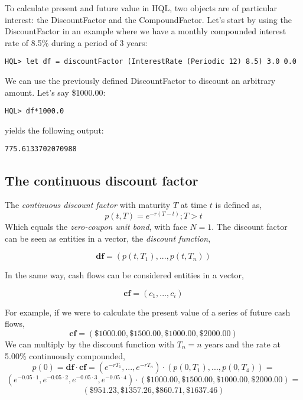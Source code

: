 \documentclass[11pt,a4paper]{article}
\numberwithin{equation}{section}
\begin{document}
To calculate present and future value in HQL, two objects are of particular interest:
the DiscountFactor and the CompoundFactor. Let's start by using the DiscountFactor in an example
where we have a monthly compounded interest rate of 8.5\% during a period of 3 years:
\FrameSep
\begin{lstlisting}
HQL> let df = discountFactor (InterestRate (Periodic 12) 8.5) 3.0 0.0
\end{lstlisting}
We can use the previously defined DiscountFactor to discount an arbitrary amount. Let's say
\$1000.00:
\FrameSep
\begin{lstlisting}
HQL> df*1000.0
\end{lstlisting}
yields the following output:
\FrameSep
\begin{lstlisting}[style=Output]
775.6133702070988
\end{lstlisting}

\subsection{The continuous discount factor}
The \textit{continuous discount factor} with maturity $T$ at time $t$ is defined as,
\[
p(t,T)=e^{-r(T-t)}; T>t
\]
Which equals the \textit{zero-coupon unit bond}, with face $N=1$. The discount factor
can be seen as entities in a vector, the \textit{discount function},

\[
\mathbf{df} = (p(t,T_1), ..., p(t,T_n))
\]

In the same way, cash flows can be considered entities in a vector,

\[
\mathbf{cf} = (c_1, ..., c_i)
\]

For example, if we were to calculate the present value of a series of future cash flows,
\[
\mathbf{cf} = (\$1000.00,\$1500.00,\$1000.00,\$2000.00)
\]
We can multiply by the discount function with $T_n=n$ years and the rate at 5.00\% continuously compounded,
\[
p(0) = \mathbf{df}\cdot\mathbf{cf} = (e^{-rT_1},...,e^{-rT_n})\cdot(p(0,T_1), ...,p(0,T_4))=
\]
\[
(e^{-0.05\cdot1},e^{-0.05\cdot2},e^{-0.05\cdot3},e^{-0.05\cdot4}) \cdot (\$1000.00,\$1500.00,\$1000.00,\$2000.00)=
\]
\[
(\$951.23,\$1357.26,\$860.71,\$1637.46)
\]
\end{document}
